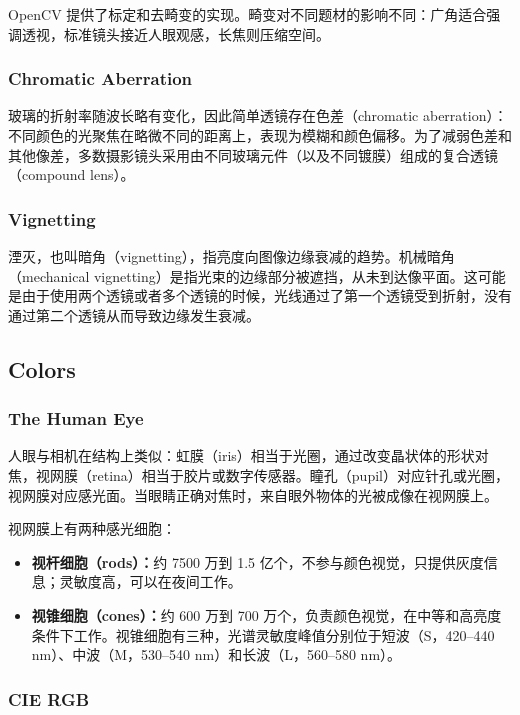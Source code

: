 OpenCV 提供了标定和去畸变的实现。畸变对不同题材的影响不同：广角适合强调透视，标准镜头接近人眼观感，长焦则压缩空间。

\subsubsection{Chromatic Aberration}

玻璃的折射率随波长略有变化，因此简单透镜存在色差（chromatic aberration）：不同颜色的光聚焦在略微不同的距离上，表现为模糊和颜色偏移。为了减弱色差和其他像差，多数摄影镜头采用由不同玻璃元件（以及不同镀膜）组成的复合透镜（compound lens）。

\subsubsection{Vignetting}

湮灭，也叫暗角（vignetting），指亮度向图像边缘衰减的趋势。机械暗角（mechanical vignetting）是指光束的边缘部分被遮挡，从未到达像平面。这可能是由于使用两个透镜或者多个透镜的时候，光线通过了第一个透镜受到折射，没有通过第二个透镜从而导致边缘发生衰减。

\subsection{Colors}

\subsubsection{The Human Eye}

人眼与相机在结构上类似：虹膜（iris）相当于光圈，通过改变晶状体的形状对焦，视网膜（retina）相当于胶片或数字传感器。瞳孔（pupil）对应针孔或光圈，视网膜对应感光面。当眼睛正确对焦时，来自眼外物体的光被成像在视网膜上。

视网膜上有两种感光细胞：

\begin{itemize}
    \item \textbf{视杆细胞（rods）：}约 7500 万到 1.5 亿个，不参与颜色视觉，只提供灰度信息；灵敏度高，可以在夜间工作。
    \item \textbf{视锥细胞（cones）：}约 600 万到 700 万个，负责颜色视觉，在中等和高亮度条件下工作。视锥细胞有三种，光谱灵敏度峰值分别位于短波（S，420--440 nm）、中波（M，530--540 nm）和长波（L，560--580 nm）。
\end{itemize}

\subsubsection{CIE RGB}

